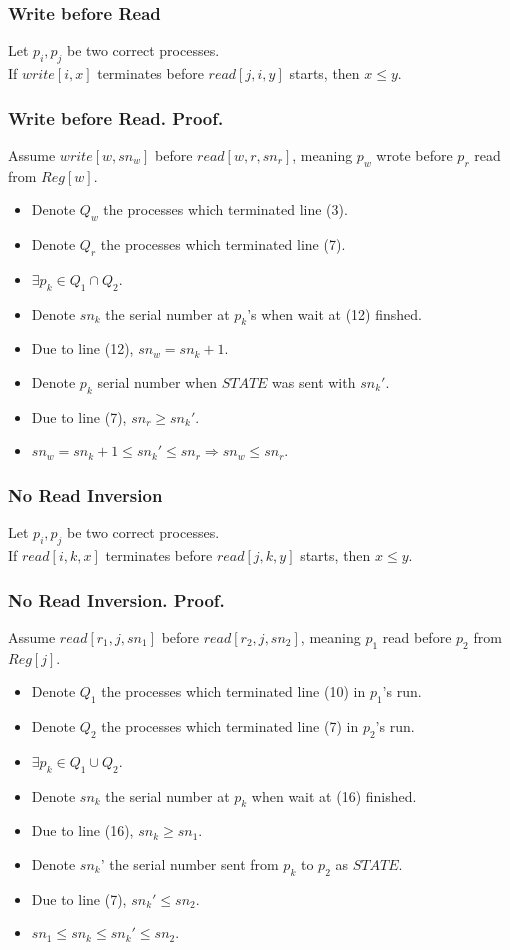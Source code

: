 \begin{frame}
    \frametitle{Write before Read}
    \begin{lemma}
        Let $p_i, p_j$ be two correct processes.\\
        If $write[i,x]$ terminates before $read[j,i,y]$ starts, then $x\leq y$.
    \end{lemma}
\end{frame}
\begin{frame}
    \frametitle{Write before Read. Proof.}
    Assume $write[w,sn_w]$ before $read[w,r,sn_r]$, meaning $p_w$ wrote 
    before $p_r$ read from $Reg[w]$.
    \begin{itemize}
        \item Denote $Q_w$ the processes which terminated line (3).
        \item Denote $Q_r$ the processes which terminated line (7).
        \item $\exists p_k\in Q_1\cap Q_2$.
        \item Denote $sn_k$ the serial number at $p_k$'s when wait at (12) finshed.
        \item Due to line (12), $sn_w=sn_k+1$.
        \item Denote $p_k$ serial number when $STATE$ was sent with $sn_k'$.
        \item Due to line (7), $sn_r\geq sn_k'$.
        \item $sn_w=sn_k+1\leq sn_k'\leq sn_r\Rightarrow sn_w\leq sn_r$.
    \end{itemize}
\end{frame}
\begin{frame}
    \frametitle{No Read Inversion}
    \begin{lemma}
        Let $p_i, p_j$ be two correct processes.\\
        If $read[i,k,x]$ terminates before $read[j,k,y]$ starts, then $x\leq y$.
    \end{lemma}
\end{frame}
\begin{frame}
    \frametitle{No Read Inversion. Proof.}
    Assume $read[r_1,j,sn_1]$ before $read[r_2,j,sn_2]$, meaning $p_1$ read
    before $p_2$ from $Reg[j]$.
    \begin{itemize}
        \item Denote $Q_1$ the processes which terminated line (10) in $p_1$'s run.
        \item Denote $Q_2$ the processes which terminated line (7) in $p_2$'s run.
        \item $\exists p_k\in Q_1\cup Q_2$.
        \item Denote $sn_k$ the serial number at $p_k$ when wait at (16) finished.
        \item Due to line (16), $sn_k\geq sn_1$.
        \item Denote $sn_k$' the serial number sent from $p_k$ to $p_2$ as $STATE$.
        \item Due to line (7), $sn_k'\leq sn_2$.
        \item $sn_1\leq sn_k\leq sn_k'\leq sn_2$.
    \end{itemize}
\end{frame}

